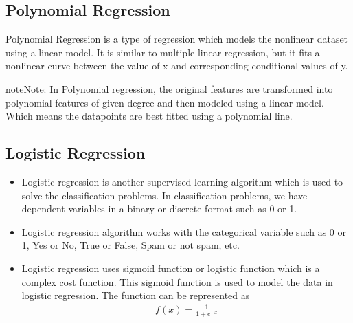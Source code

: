 \documentclass[letterpaper,10pt,english]{sphinxmanual}
\let\sphinxpxdimen\pdfpxdimen\else\newdimen\sphinxpxdimen
\begin{document}
\subsection{Polynomial Regression}
\label{\detokenize{regression/regression:polynomial-regression}}
\sphinxAtStartPar
Polynomial Regression is a type of regression which models the non\sphinxhyphen{}linear dataset using a linear model.
It is similar to multiple linear regression, but it fits a non\sphinxhyphen{}linear curve between the value of x and corresponding conditional values of y.

\begin{sphinxadmonition}{note}{Note:}
\sphinxAtStartPar
In Polynomial regression, the original features are transformed into polynomial features of given degree and then modeled using a linear model. Which means the datapoints are best fitted using a polynomial line.
\end{sphinxadmonition}

\noindent\sphinxincludegraphics[width=400\sphinxpxdimen]{{polynomial}.png}


\subsection{Logistic Regression}
\label{\detokenize{regression/regression:logistic-regression}}\begin{itemize}
\item {} 
\sphinxAtStartPar
Logistic regression is another supervised learning algorithm which is used to solve the classification problems. In classification problems, we have dependent variables in a binary or discrete format such as 0 or 1.

\item {} 
\sphinxAtStartPar
Logistic regression algorithm works with the categorical variable such as 0 or 1, Yes or No, True or False, Spam or not spam, etc.

\item {} 
\sphinxAtStartPar
Logistic regression uses sigmoid function or logistic function which is a complex cost function. This sigmoid function is used to model the data in logistic regression. The function can be represented as
\begin{equation*}
\begin{split}f(x)=\frac{1}{1+e^{-x}}\end{split}
\end{equation*}
\end{itemize}
\end{document}
